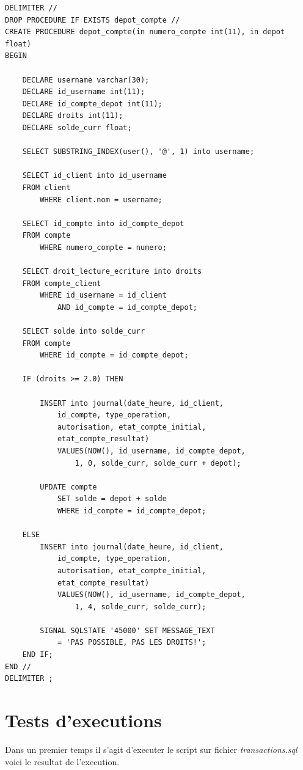 \documentclass[paper=a4, fontsize=11pt]{scrartcl} %
\numberwithin{equation}{section} %
\numberwithin{figure}{section} %
\numberwithin{table}{section} %
\begin{document}
\begin{lstlisting}
DELIMITER //
DROP PROCEDURE IF EXISTS depot_compte //
CREATE PROCEDURE depot_compte(in numero_compte int(11), in depot float)
BEGIN
	
    DECLARE username varchar(30);
    DECLARE id_username int(11);
    DECLARE id_compte_depot int(11);
    DECLARE droits int(11);
    DECLARE solde_curr float;
    
    SELECT SUBSTRING_INDEX(user(), '@', 1) into username;
    
    SELECT id_client into id_username
    FROM client 
		WHERE client.nom = username;
        
	SELECT id_compte into id_compte_depot
    FROM compte
		WHERE numero_compte = numero;

	SELECT droit_lecture_ecriture into droits
    FROM compte_client
		WHERE id_username = id_client 
			AND id_compte = id_compte_depot;
     
	SELECT solde into solde_curr
	FROM compte
		WHERE id_compte = id_compte_depot;
             
    IF (droits >= 2.0) THEN
		
        INSERT into journal(date_heure, id_client,
        	id_compte, type_operation, 
        	autorisation, etat_compte_initial, 
        	etat_compte_resultat)
			VALUES(NOW(), id_username, id_compte_depot, 
				1, 0, solde_curr, solde_curr + depot);
            
		UPDATE compte
			SET solde = depot + solde
			WHERE id_compte = id_compte_depot;

	ELSE
		INSERT into journal(date_heure, id_client, 
			id_compte, type_operation,
			autorisation, etat_compte_initial, 
			etat_compte_resultat)
			VALUES(NOW(), id_username, id_compte_depot, 
				1, 4, solde_curr, solde_curr);
            
		SIGNAL SQLSTATE '45000' SET MESSAGE_TEXT 
			= 'PAS POSSIBLE, PAS LES DROITS!';
	END IF;
END //
DELIMITER ;
\end{lstlisting}

\newpage
\section{Tests d'executions}
Dans un premier temps il s'agit d'executer le script sur fichier \textit{transactions.sql} voici le resultat de l'execution.
\end{document}
